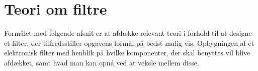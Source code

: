 \chapter{Teori om filtre}
\label{TeoriOmFiltre}
Formålet med følgende afsnit er at afdække relevant teori i forhold til at designe et filter, der tilfredsstiller opgavens formål på bedst mulig vis. Opbygningen af et elektronisk filter med henblik på hvilke komponenter, der skal benyttes vil blive afdækket, samt hvad man kan opnå ved at veksle mellem disse.















%
%
%